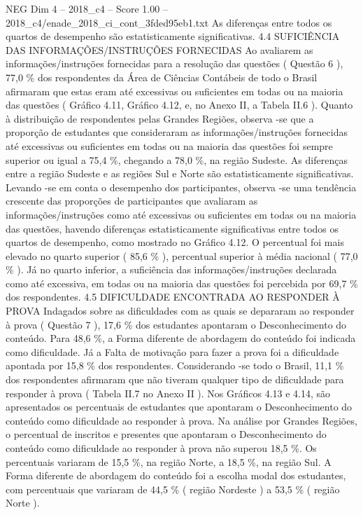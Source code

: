 \begin{textsample}{NEG Dim 4 – 2018\_c4 – Score 1.00 – 2018\_c4/enade\_2018\_ci\_cont\_3fded95eb1.txt}
As diferenças entre todos os quartos de desempenho são estatisticamente significativas. 4.4 SUFICIÊNCIA DAS INFORMAÇÕES/INSTRUÇÕES FORNECIDAS Ao avaliarem as informações/instruções fornecidas para a resolução das questões ( Questão 6 ), 77,0 \% dos respondentes da Área de Ciências Contábeis de todo o Brasil afirmaram que estas eram até excessivas ou suficientes em todas ou na maioria das questões ( Gráfico 4.11, Gráfico 4.12, e, no Anexo II, a Tabela II.6 ).
Quanto à distribuição de respondentes pelas Grandes Regiões, observa -se que a proporção de estudantes que consideraram as informações/instruções fornecidas até excessivas ou suficientes em todas ou na maioria das questões foi sempre superior ou igual a 75,4 \%, chegando a 78,0 \%, na região Sudeste.
As diferenças entre a região Sudeste e as regiões Sul e Norte são estatisticamente significativas.
Levando -se em conta o desempenho dos participantes, observa -se uma tendência crescente das proporções de participantes que avaliaram as informações/instruções como até excessivas ou suficientes em todas ou na maioria das questões, havendo diferenças estatisticamente significativas entre todos os quartos de desempenho, como mostrado no Gráfico 4.12.
O percentual foi mais elevado no quarto superior ( 85,6 \% ), percentual superior à média nacional ( 77,0 \% ).
Já no quarto inferior, a suficiência das informações/instruções declarada como até excessiva, em todas ou na maioria das questões foi percebida por 69,7 \% dos respondentes. 4.5 DIFICULDADE ENCONTRADA AO RESPONDER À PROVA Indagados sobre as dificuldades com as quais se depararam ao responder à prova ( Questão 7 ), 17,6 \% dos estudantes apontaram o Desconhecimento do conteúdo.
Para 48,6 \%, a Forma diferente de abordagem do conteúdo foi indicada como dificuldade.
Já a Falta de motivação para fazer a prova foi a dificuldade apontada por 15,8 \% dos respondentes.
Considerando -se todo o Brasil, 11,1 \% dos respondentes afirmaram que não tiveram qualquer tipo de dificuldade para responder à prova ( Tabela II.7 no Anexo II ).
Nos Gráficos 4.13 e 4.14, são apresentados os percentuais de estudantes que apontaram o Desconhecimento do conteúdo como dificuldade ao responder à prova.
Na análise por Grandes Regiões, o percentual de inscritos e presentes que apontaram o Desconhecimento do conteúdo como dificuldade ao responder à prova não superou 18,5 \%.
Os percentuais variaram de 15,5 \%, na região Norte, a 18,5 \%, na região Sul.
A Forma diferente de abordagem do conteúdo foi a escolha modal dos estudantes, com percentuais que variaram de 44,5 \% ( região Nordeste ) a 53,5 \% ( região Norte ).

\end{textsample}
